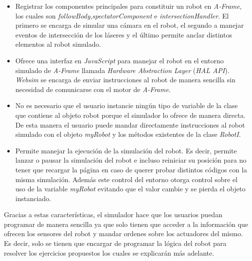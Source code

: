 \begin{itemize}
    \item Registrar los componentes principales para constituir un robot en \textit{A-Frame}, los cuales son \textit{followBody},\textit{spectatorComponent} e \textit{intersectionHandler}. El primero se encarga de simular una cámara en el robot, el segundo a manejar eventos de intersección de los láseres y el último permite anclar distintos elementos al robot simulado. 
    
    \item Ofrece una interfaz en \textit{JavaScript} para manejar el robot en el entorno simulado de \textit{A-Frame} llamada \textit{Hardware Abstraction Layer} (\textit{HAL API}). \textit{Websim} se encarga de enviar instrucciones al robot de manera sencilla sin necesidad de comunicarse con el motor de \textit{A-Frame}. 
    
    \item No es necesario que el usuario instancie ningún tipo de variable de la clase que contiene al objeto robot porque el simulador lo ofrece de manera directa. De esta manera el usuario puede mandar directamente instrucciones al robot simulado con el objeto \textit{myRobot} y los métodos existentes de la clase \textit{RobotI}.
    
    \item Permite manejar la ejecución de la simulación del robot. Es decir, permite lanzar o pausar la simulación del robot e incluso reiniciar su posición para no tener que recargar la página en caso de querer probar distintos códigos con la misma simulación. Además este control del entorno otorga control sobre el uso de la variable \textit{myRobot} evitando que el valor cambie y se pierda el objeto instanciado.
\end{itemize}

Gracias a estas características, el simulador hace que los usuarios puedan programar de manera sencilla ya que solo tienen que acceder a la información que ofrecen los sensores del robot y mandar ordenes sobre los actuadores del mismo. Es decir, solo  se tienen que encargar de programar la lógica del robot para resolver los ejercicios propuestos los cuales se explicarán más adelante. 

